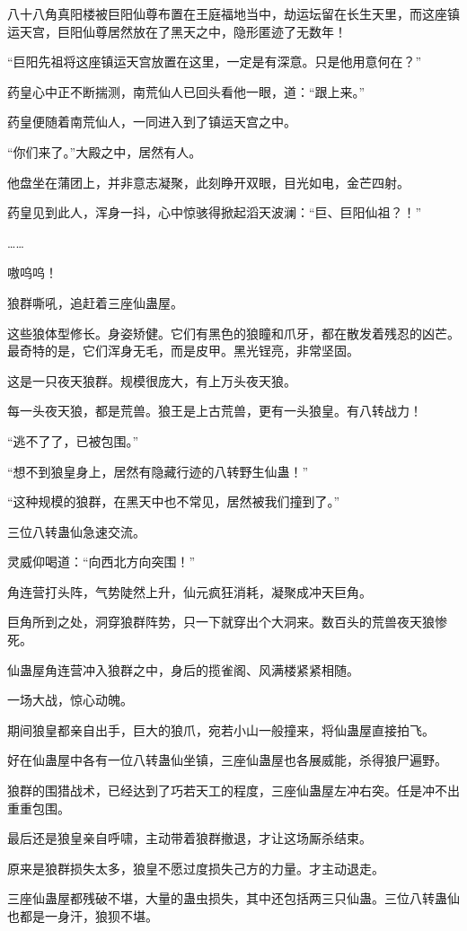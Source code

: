 \begin{this_body}
八十八角真阳楼被巨阳仙尊布置在王庭福地当中，劫运坛留在长生天里，而这座镇运天宫，巨阳仙尊居然放在了黑天之中，隐形匿迹了无数年！

“巨阳先祖将这座镇运天宫放置在这里，一定是有深意。只是他用意何在？”

药皇心中正不断揣测，南荒仙人已回头看他一眼，道：“跟上来。”

药皇便随着南荒仙人，一同进入到了镇运天宫之中。

“你们来了。”大殿之中，居然有人。

他盘坐在蒲团上，并非意志凝聚，此刻睁开双眼，目光如电，金芒四射。

药皇见到此人，浑身一抖，心中惊骇得掀起滔天波澜：“巨、巨阳仙祖？！”

……

嗷呜呜！

狼群嘶吼，追赶着三座仙蛊屋。

这些狼体型修长。身姿矫健。它们有黑色的狼瞳和爪牙，都在散发着残忍的凶芒。最奇特的是，它们浑身无毛，而是皮甲。黑光锃亮，非常坚固。

这是一只夜天狼群。规模很庞大，有上万头夜天狼。

每一头夜天狼，都是荒兽。狼王是上古荒兽，更有一头狼皇。有八转战力！

“逃不了了，已被包围。”

“想不到狼皇身上，居然有隐藏行迹的八转野生仙蛊！”

“这种规模的狼群，在黑天中也不常见，居然被我们撞到了。”

三位八转蛊仙急速交流。

灵威仰喝道：“向西北方向突围！”

角连营打头阵，气势陡然上升，仙元疯狂消耗，凝聚成冲天巨角。

巨角所到之处，洞穿狼群阵势，只一下就穿出个大洞来。数百头的荒兽夜天狼惨死。

仙蛊屋角连营冲入狼群之中，身后的揽雀阁、风满楼紧紧相随。

一场大战，惊心动魄。

期间狼皇都亲自出手，巨大的狼爪，宛若小山一般撞来，将仙蛊屋直接拍飞。

好在仙蛊屋中各有一位八转蛊仙坐镇，三座仙蛊屋也各展威能，杀得狼尸遍野。

狼群的围猎战术，已经达到了巧若天工的程度，三座仙蛊屋左冲右突。任是冲不出重重包围。

最后还是狼皇亲自呼啸，主动带着狼群撤退，才让这场厮杀结束。

原来是狼群损失太多，狼皇不愿过度损失己方的力量。才主动退走。

三座仙蛊屋都残破不堪，大量的蛊虫损失，其中还包括两三只仙蛊。三位八转蛊仙也都是一身汗，狼狈不堪。


\end{this_body}
